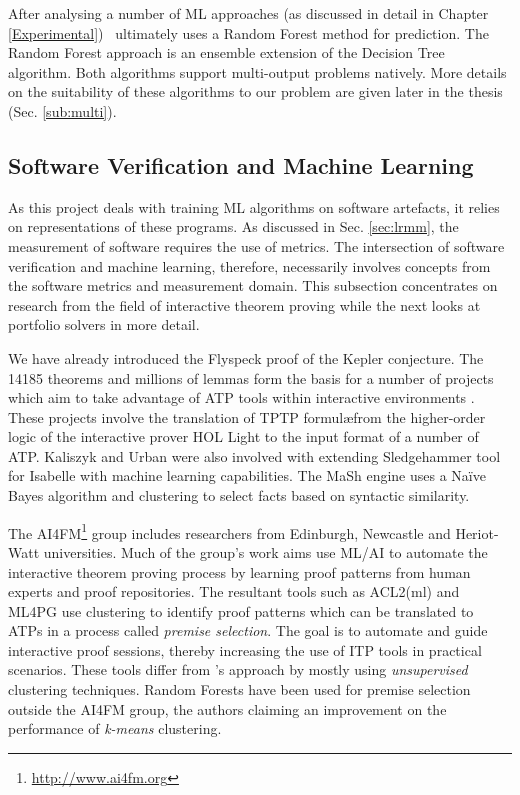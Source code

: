 After analysing a number of ML approaches (as discussed in detail in Chapter \ref{Experimental}) \where~ultimately uses a Random Forest \cite{RandomForests} method for prediction. The Random Forest approach is an ensemble extension of the Decision Tree \cite{DecisionTrees} algorithm. Both algorithms support multi-output problems natively. More details on the suitability of these algorithms to our problem are given later in the thesis (Sec. \ref{sub:multi}). 



\subsection{Software Verification and Machine Learning}
\label{sub:lrsvml}

As this project deals with training ML algorithms on software artefacts, it relies on representations of these programs. As discussed in Sec. \ref{sec:lrmm}, the measurement of software requires the use of metrics. The intersection of software verification and machine learning, therefore, necessarily involves concepts from the software metrics and measurement domain. This subsection concentrates on research from the field of interactive theorem proving while the next looks at portfolio solvers in more detail.

We have already introduced the Flyspeck \cite{hales-kepler} proof of the Kepler conjecture. The 14185 theorems and millions of lemmas form the basis for a number of projects which aim to take advantage of ATP tools within interactive environments \cite{Flyspec, Kaliszyk2015109}. These projects involve the translation of TPTP formul\ae from the higher-order logic of the  interactive prover \textsf{HOL Light} to the input format of a number of ATP. Kaliszyk and Urban were also involved with extending Sledgehammer \cite{threeyears} tool for Isabelle \cite{Isabelle} with machine learning capabilities. The MaSh \cite{Sledgehammer} engine uses a Na{\"i}ve Bayes algorithm and clustering to select facts based on syntactic similarity.       

The AI4FM\footnote{\url{http://www.ai4fm.org}} group includes researchers from Edinburgh, Newcastle and Heriot-Watt universities. Much of the group's work \cite{Heras2013, ML4PG, bundy_et_al:DR:2012:3731} aims use ML/AI to automate the interactive theorem proving process by learning proof patterns from human experts and proof repositories. The resultant tools such as ACL2(ml) \cite{Heras2013} and ML4PG \cite{ML4PG} use clustering to identify proof patterns which can be translated to ATPs in a process called \textit{premise selection}. The goal is to automate and guide interactive proof sessions, thereby increasing the use of ITP tools in practical scenarios. These tools differ from \where's approach by mostly using \textit{unsupervised} clustering techniques. Random Forests have been used for premise selection \cite{Farber2015} outside the AI4FM group, the authors claiming an improvement on the performance of \textit{k-means} clustering. 

